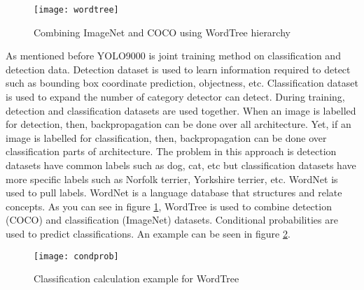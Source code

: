 \documentclass{article}
\begin{document}
\begin{enumerate}
    \begin{figure}
        \centering
        \texttt{[image: wordtree]}
        \caption{Combining ImageNet and COCO using WordTree hierarchy}
        \label{fig:wordtree1}
    \end{figure}
    
    As mentioned before YOLO9000 is joint training method on classification and detection 
    data. Detection dataset is used to learn information required to detect such as bounding 
    box coordinate prediction, objectness, etc. Classification dataset is used to expand the 
    number of category detector can detect. During training, detection and classification 
    datasets are used together. When an image is labelled for detection, then, backpropagation 
    can be done over all architecture. Yet, if an image is labelled for classification, then, 
    backpropagation can be done over classification parts of architecture. The problem in this 
    approach is detection datasets have common labels such as dog, cat, etc but classification 
    datasets have more specific labels such as Norfolk terrier, Yorkshire terrier, etc. 
    WordNet is used to pull labels. WordNet is a language database that structures and relate 
    concepts. As you can see in figure \ref{fig:wordtree1}, WordTree is used to combine 
    detection (COCO) and classification (ImageNet) datasets. Conditional probabilities are used 
    to predict classifications. An example can be seen in figure \ref{fig:condprob1}.
    
    \begin{figure}
        \centering
        \texttt{[image: condprob]}
        \caption{Classification calculation example for WordTree}
        \label{fig:condprob1}
    \end{figure}
\end{enumerate}
\end{document}

